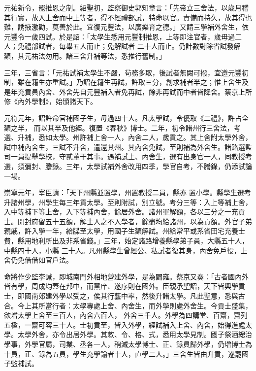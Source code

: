 \begin{pinyinscope}
 元祐新令，罷推恩之制。紹聖初，監察御史郭知章言：「先帝立三舍法，以歲月稽其行實，故入上舍而中上等者，得不經禮部試，特命以官。責備而持久，故其得也難，誘掖激勸，莫善於此。宜復元豐法，以廣樂育之德。」又請三學補外舍生，依元豐令一歲四試。於是詔：「太學生悉用元豐制推恩，上等即注官者，歲毋過二人；免禮部試者，每舉五人而止；免解試者
 二十人而止。仍計數對除省試發解額，其元祐法勿用。諸三舍升補等法，悉推行舊制。」



 三年，三省言：「元祐試補太學生不嚴，茍務多取，後試者無闕可撥，宜遵元豐初制，雖在籍生亦重試。」乃詔在籍生再試，許取三分，創求補者半之；惟上舍生及是年充貢員內舍、外舍先自元豐補入者免再試，餘非再試而中者皆降舍。蔡京上所修《內外學制》，始頒諸天下。



 元符元年，詔許命官補國子生，毋過四十人。凡太學試，令優取《二禮》，許占全額之半，
 而以其半及他經。復置《春秋》博士。二年，初令諸州行三舍法，考選、升補，悉如太學。州許補上舍一人，內舍二人，歲貢之。其上舍附太學外舍，試中補內舍生，三試不升舍，遣還其州。其內舍免試，至則補為外舍生。諸路選監司一員提舉學校，守貳董干其事。遇補試上、內舍生，選有出身官一人，同教授考選，須彌封、謄錄。三年，太學試補外舍改用四季，學官自考，不謄錄，仍添試論一場。



 崇寧元年，宰臣請：「天下州縣並置學，州置教授二員，縣亦
 置小學。縣學生選考升諸州學，州學生每三年貢太學。至則附試，別立號。考分三等：入上等補上舍，入中等補下等上舍，入下等補內舍，餘居外舍。諸州軍解額，各以三分之一充貢士。開封府留五十五額，解士人之不入學者，餘盡均給諸州，以為貢額。外官子弟親戚，許入學一年，給牒至太學，用國子生額解試。州給常平或系省田宅充養士費，縣用地利所出及非系省錢。」三年，始定諸路增養縣學弟子員，大縣五十人，中縣四十人，小縣
 三十人。凡州縣學生曾經公、私試者復其身，內舍免戶役，上舍仍免借借如官戶法。



 命將作少監李誡，即城南門外相地營建外學，是為闢雍。蔡京又奏：「古者國內外皆有學，周成均蓋在邦中，而黨庠、遂序則在國外。臣親承聖詔，天下皆興學貢士，即國南郊建外學以受之，俟其行藝中率，然後升諸太學。凡此聖意，悉與古合。今上其所當行者：太學專處上舍、內舍生，而外學則處外舍生。今貢士盛集，欲增太學上舍至三百人，內舍六百人，
 外舍三千人。外學為四講堂、百齋，齋列五楹，一齋可容三十人。士初貢至，皆入外學，經試補入上舍、內舍，始得進處太學。太學外舍，亦令出居外學。其敕、令、格、式，悉用太學見制。國子祭酒總治學事，外學官屬，司業、丞各一人，稍減太學博士、正、錄員歸外學，仍增博士為十員，正、錄為五員，學生充學諭者十人，直學二人。」三舍生皆由升貢，遂罷國子監補試。




\end{pinyinscope}
